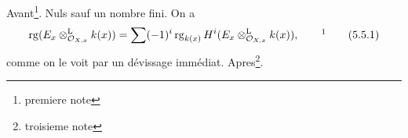 \documentclass[11pt]{article}
\begin{document}
Avant\footnote{premiere note}. Nuls sauf un nombre fini. On a
\begin{equation}
 \operatorname{rg}(E_x\otimes_{\mathcal O_{X,x}}^{\mathrm L}k(x))=\sum(-1)^i\operatorname{rg}_{k(x)}H^i(E_x\otimes_{\mathcal O_{X,x}}^{\mathrm L}k(x)),\qquad\mbox{\footnotemark}\tag{5.5.1}
\end{equation}
%
comme on le voit par un dévissage immédiat. Apres\footnote{troisieme note}.
\end{document}
